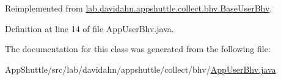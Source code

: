 \-Reimplemented from \hyperlink{classlab_1_1davidahn_1_1appshuttle_1_1collect_1_1bhv_1_1_base_user_bhv_ab6813ac64ce1f0d009c892b5cac261d6}{lab.\-davidahn.\-appshuttle.\-collect.\-bhv.\-Base\-User\-Bhv}.



\-Definition at line 14 of file \-App\-User\-Bhv.\-java.



\-The documentation for this class was generated from the following file\-:\begin{DoxyCompactItemize}
\item 
\-App\-Shuttle/src/lab/davidahn/appshuttle/collect/bhv/\hyperlink{_app_user_bhv_8java}{\-App\-User\-Bhv.\-java}\end{DoxyCompactItemize}
